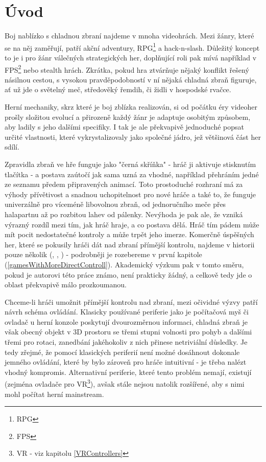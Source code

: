 \chapter*{Úvod}

Boj nablízko s chladnou zbraní najdeme v mnoha videohrách. Mezi žánry, které se na něj zaměřují, patří akční adventury, RPG\footnote{\Acl{RPG}} a hack-n-slash. Důležitý koncept to je i pro žánr válečných strategických her, doplňující roli pak mívá například v FPS\footnote{\Acl{FPS}} nebo stealth hrách. Zkrátka, pokud hra ztvárňuje nějaký konflikt řešený násilnou cestou, s vysokou pravděpodobností v ní nějaká chladná zbraň figuruje, ať už jde o světelný meč, středověký řemdih, či židli v hospodské rvačce.

Herní mechaniky, skrz které je boj zblízka realizován, si od počátku éry videoher prošly složitou evolucí a přirozeně každý žánr je adaptuje osobitým způsobem, aby ladily s jeho dalšími specifiky. I tak je ale překvapivě jednoduché popsat určité vlastnosti, které vykrystalizovaly jako společné jádro, jež většinová část her sdílí.

Zpravidla zbraň ve hře funguje jako "černá skříňka" - hráč ji aktivuje stisknutím tlačítka - a postava zaútočí jak sama uzná za vhodné, například přehráním jedné ze seznamu předem připravených animací. Toto prostoduché rozhraní má za výhody přívětivost a snadnou uchopitelnost pro nové hráče a také to, že funguje univerzálně pro víceméně libovolnou zbraň, od jednoručního meče přes halapartnu až po rozbitou lahev od pálenky. Nevýhoda je pak ale, že vzniká výrazný rozdíl mezi tím, jak hráč hraje, a co postava dělá. Hráč tím pádem může mít pocit nedostatečné kontroly a může trpět jeho imerze. Komerčně úspěšných her, které se pokusily hráči dát nad zbraní přímější kontrolu, najdeme v historii pouze několik (\cite{DieByTheSword}, \cite{MountAndBlade}, \cite{KCD}) - podrobněji je rozebereme v první kapitole (\ref{gamesWithMoreDirectControll}). Akademický výzkum pak v tomto směru, pokud je autorovi této práce známo, není prakticky žádný, a celkově tedy jde o oblast překvapivě málo prozkoumanou.
  
Chceme-li hráči umožnit přímější kontrolu nad zbraní, mezi očividné výzvy patří návrh schéma ovládání. Klasicky používané periferie jako je počítačová myš či ovladač u herní konzole poskytují dvourozměrnou informaci, chladná zbraň je však obecný objekt v 3D prostoru se třemi stupni volnosti pro pohyb a dalšími třemi pro rotaci, zanedbání jakéhokoliv z nich přinese netriviální důsledky. Je tedy zřejmé, že pomocí klasických periferií není možné dosáhnout dokonale jemného ovládání, které by bylo zároveň pro hráče intuitivní - je třeba nalézt vhodný kompromis. Alternativní periferie, které tento problém nemají, existují (zejména ovladače pro VR\footnote{\Acl{VR} - viz kapitolu \ref{VRControllers}}), avšak stále nejsou natolik rozšířené, aby s nimi mohl počítat herní mainstream. 

